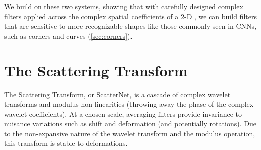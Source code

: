 We build on these two systems, showing that with carefully designed complex
filters applied across the complex spatial coefficients of a 2-D \DTCWT,  
we can build filters that are sensitive to more recognizable shapes like
those commonly seen in CNNs, such as corners and curves (\autoref{sec:corners}). 

\section{The Scattering Transform}
\label{sec:scatternet}

The Scattering Transform, or ScatterNet, is a cascade of complex wavelet transforms and
modulus non-linearities (throwing away the phase of the complex wavelet
coefficients). At a chosen scale, averaging filters provide invariance
to nuisance variations such as shift and deformation (and potentially
rotations). Due to the non-expansive nature of the wavelet
transform and the modulus operation, this transform is stable to
deformations. 

